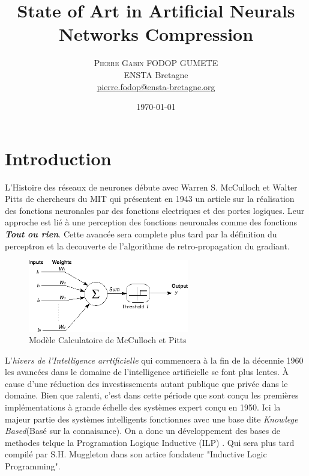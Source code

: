 \documentclass[twoside,twocolumn]{article}
\title{State of Art in Artificial Neurals Networks Compression} %
\author{%
\textsc{Pierre Gabin FODOP GUMETE} \\[1ex] %
\normalsize ENSTA Bretagne \\ %
\normalsize \href{mailto:pierre.fodop@ensta-bretagne.org}{pierre.fodop@ensta-bretagne.org} %
}
\date{\today} %
\begin{document}
\maketitle


\section{Introduction}
L'Histoire des réseaux de neurones débute avec Warren S. McCulloch et Walter Pitts de chercheurs du MIT qui présentent 
en 1943 un article sur la réalisation des fonctions neuronales par des fonctions electriques et des portes logiques\cite{warren1}.
Leur approche est lié à une perception des fonctions neuronales comme des fonctions {\bf\textit{Tout ou rien}}. Cette avancée 
sera complete plus tard par la définition du perceptron\cite{RosenBlatt1} et la decouverte de l'algorithme de retro-propagation 
du gradiant\cite{Rumelhart1}.

\begin{figure}[h]
\centering
\includegraphics[width=70mm]{CulochNeurone.png}
\caption{Modèle Calculatoire de McCulloch et Pitts}
\label{SimpleNeuron}
\end{figure}

L'\textit{hivers de l'Intelligence arrtificielle} qui commencera à la fin de la décennie 1960 les avancées dans le domaine de l'intelligence artificielle
se font plus lentes. À cause d'une réduction des investissements autant publique que privée dans le domaine. Bien que ralenti, c'est dans cette période que
sont conçu les premières implémentations à grande échelle des systèmes expert conçu en 1950. Ici la majeur partie des systèmes intelligents fonctionnes avec une 
base dite \textit{Knowlege Based}(Basé sur la connaisance). On a donc un développement des bases de methodes telque la Programation Logique Inductive (ILP)
\cite{Muggleton1}\cite{Ehud1}. Qui sera plus tard compilé par S.H. Muggleton dans son artice fondateur "Inductive Logic Programming"\cite{Muggleton2}.
\end{document}
